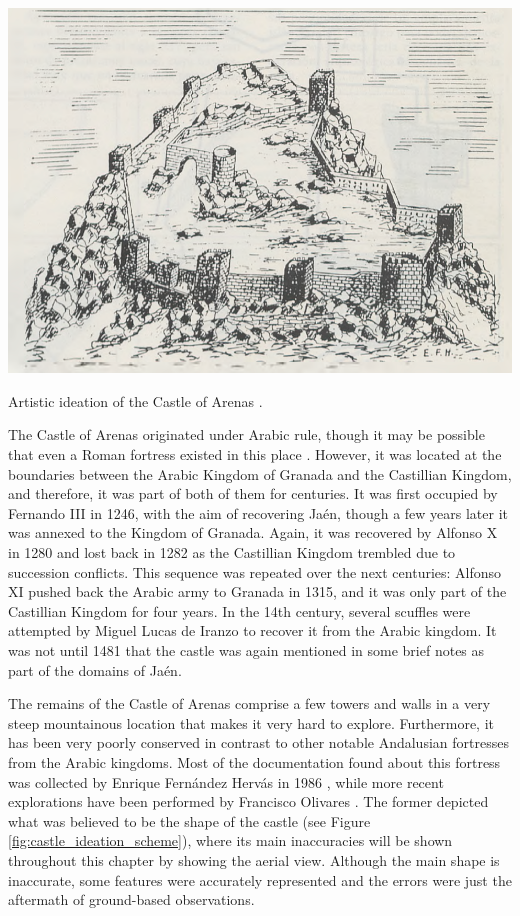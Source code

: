 \begin{marginfigure}[-1.0cm]
    \centering
    \includegraphics[width=\linewidth]{figs/castle_puerta_arenas/castle_ideation.PNG}
    \caption{Artistic ideation of the Castle of Arenas \cite{fernandez_hervas_castillo_1986}.}
    \label{fig:castle_ideation_art}
\end{marginfigure}
The Castle of Arenas originated under Arabic rule, though it may be possible that even a Roman fortress existed in this place \cite{fernandez_hervas_castillo_1986}. However, it was located at the boundaries between the Arabic Kingdom of Granada and the Castillian Kingdom, and therefore, it was part of both of them for centuries. It was first occupied by Fernando III in 1246, with the aim of recovering Jaén, though a few years later it was annexed to the Kingdom of Granada. Again, it was recovered by Alfonso X in 1280 and lost back in 1282 as the Castillian Kingdom trembled due to succession conflicts. This sequence was repeated over the next centuries: Alfonso XI pushed back the Arabic army to Granada in 1315, and it was only part of the Castillian Kingdom for four years. In the 14th century, several scuffles were attempted by Miguel Lucas de Iranzo to recover it from the Arabic kingdom. It was not until 1481 that the castle was again mentioned in some brief notes as part of the domains of Jaén.

The remains of the Castle of Arenas comprise a few towers and walls in a very steep mountainous location that makes it very hard to explore. Furthermore, it has been very poorly conserved in contrast to other notable Andalusian fortresses from the Arabic kingdoms. Most of the documentation found about this fortress was collected by Enrique Fernández Hervás in 1986 \cite{fernandez_hervas_castillo_1986}, while more recent explorations have been performed by Francisco Olivares \cite{olivares_castillos_1992}. The former depicted what was believed to be the shape of the castle (see Figure \ref{fig:castle_ideation_scheme}), where its main inaccuracies will be shown throughout this chapter by showing the aerial view. Although the main shape is inaccurate, some features were accurately represented and the errors were just the aftermath of ground-based observations.

